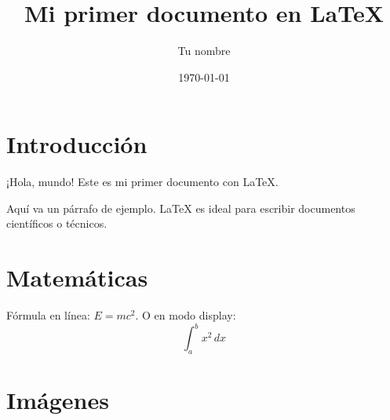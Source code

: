 \documentclass[12pt, a4paper]{article} %
\title{Mi primer documento en \LaTeX}  %
\author{Tu nombre}                     %
\date{\today}                          %
\begin{document}
\maketitle   %

\section{Introducción}
¡Hola, mundo! Este es mi primer documento con \LaTeX. 

Aquí va un párrafo de ejemplo. \LaTeX{} es ideal para escribir documentos científicos o técnicos.

\section{Matemáticas}
Fórmula en línea: $E = mc^2$. O en modo display:
\[
    \int_{a}^{b} x^2 \,dx
\]

\section{Imágenes}
\end{document}
